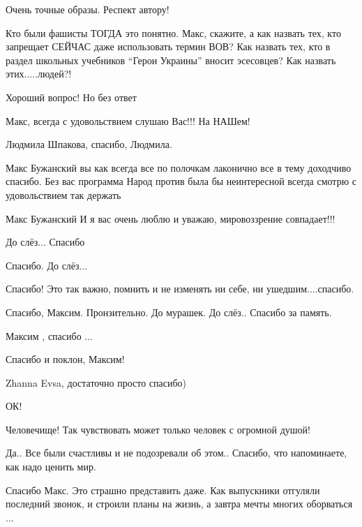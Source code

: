 \begin{itemize}
Очень точные образы. Респект автору!


Кто были фашисты ТОГДА это понятно. Макс, скажите, а как назвать тех, кто
запрещает СЕЙЧАС даже использовать термин ВОВ? Как назвать тех, кто в раздел
школьных учебников \enquote{Герои Украины} вносит эсесовцев? Как назвать
этих.....людей?!

Хороший вопрос! Но без ответ


Макс, всегда с удовольствием слушаю Вас!!! На НАШем!

Людмила Шпакова, спасибо, Людмила.


Макс Бужанский вы как всегда все по полочкам лаконично все в тему доходчиво
спасибо. Без вас программа Народ против была бы неинтересной всегда смотрю с
удовольствием так держать

Макс Бужанский
И я вас очень люблю и уважаю, мировоззрение совпадает!!!

До слёз... Спасибо

Спасибо. До слёз...

Спасибо! Это так важно, помнить и не изменять ни себе, ни ушедшим....спасибо.

Спасибо, Максим. Пронзительно. До мурашек. До слёз.. Спасибо за память.

Максим , спасибо ...

Спасибо и поклон, Максим!

Zhanna Evsa, достаточно просто спасибо)

ОК!


Человечище! Так чувствовать может только человек с огромной душой!


Да.. Все были счастливы и не подозревали об этом..  Спасибо, что напоминаете,
как надо ценить мир.


Спасибо Макс. Это страшно представить даже. Как выпускники отгуляли последний
звонок, и строили планы на жизнь, а завтра мечты многих оборваться ...


\end{itemize}
